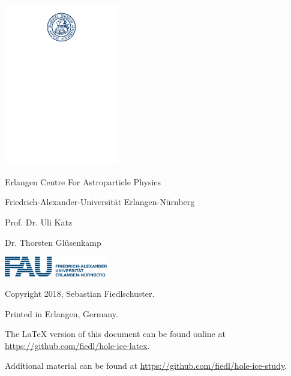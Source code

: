 
\makeatletter
\begin{titlepage}
  \begin{center}

    \LARGE \@title

    \vspace{1cm}

    \large

    \@author \medskip

    \@date

    \vspace{1cm}
    \includegraphics[width=5cm, decodearray={0.2 0.5}]{img/fau-siegel-blau}
    \vspace{1cm}

    Erlangen Centre For Astroparticle Physics \medskip

    Friedrich-Alexander-Universität Erlangen-Nürnberg \medskip

    Prof. Dr. Uli Katz \medskip

    Dr. Thorsten Glüsenkamp

    \vfill
    \includegraphics[width=4.5cm]{img/FAU-Logo-Transparent-PNG-RGB}\hfill
    \hfill


  \end{center}
\end{titlepage}
\makeatother


\newpage
\thispagestyle{empty}
\mbox{}\vfill
Copyright 2018, Sebastian Fiedlschuster.

Printed in Erlangen, Germany.

The \LaTeX\xspace version of this document can be found online at \url{https://github.com/fiedl/hole-ice-latex}.

Additional material can be found at \url{https://github.com/fiedl/hole-ice-study}.

